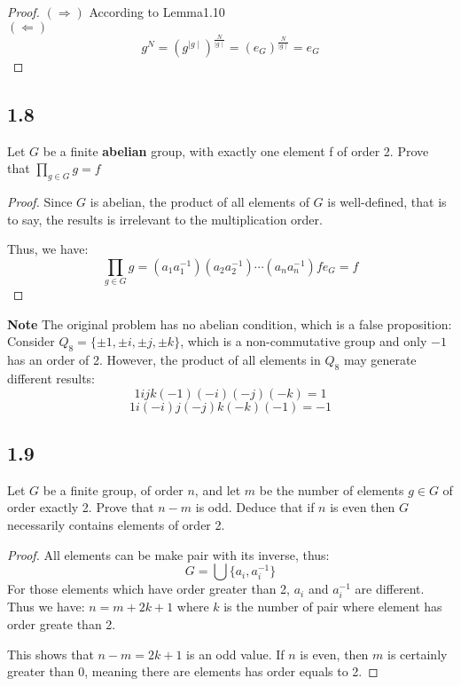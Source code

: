 \documentclass[a4paper, 12pt]{article}
\begin{document}
\begin{proof}
  $(\Rightarrow)$ According to Lemma1.10\\
  \indent\indent $(\Leftarrow)$ $$g^N=(g^{\mid g\mid})^{\frac{N}{\mid g\mid}}=(e_G)^{\frac{N}{\mid g\mid}}=e_G$$
\end{proof}

\subsection*{1.8} Let $G$ be a finite {\color{red}\textbf{abelian}} group, with exactly one element f of order 2. Prove that $\prod_{g\in G}g=f$
\begin{proof}
  Since $G$ is abelian, the product of all elements of $G$ is well-defined, that is to say, the results is irrelevant to the multiplication order.

  Thus, we have:
  $$
  \prod_{g\in G}g = (a_1a_1^{-1})(a_2a_2^{-1})\cdots(a_na_n^{-1})fe_G=f
  $$
\end{proof}
\noindent \textbf{Note} The original problem has no abelian condition, which is a false proposition: Consider 
$Q_8=\{\pm 1, \pm i, \pm j, \pm k\}$, which is a non-commutative group and only $-1$ has an order of 2. However, the 
product of all elements in $Q_8$ may generate different results:
$$
1ijk(-1)(-i)(-j)(-k) = 1
$$
$$
1i(-i)j(-j)k(-k)(-1) = -1
$$

\subsection*{1.9} Let $G$ be a finite group, of order $n$, and let $m$ be the number of 
elements $g \in G$ of order exactly 2. Prove that $n-m$ is odd. Deduce that if $n$ is even then
$G$ necessarily contains elements of order 2.
\begin{proof}
  All elements can be make pair with its inverse, thus:
  $$
  G=\bigcup \{a_i, a_i^{-1}\}
  $$
  For those elements which have order greater than 2, $a_i$ and $a_i^{-1}$ are different. Thus we have:
  $n = m + 2k + 1$ where $k$ is the number of pair where element has order greate than 2.

  This shows that $n-m=2k+1$ is an odd value. If $n$ is even, then $m$ is certainly greater than 0, meaning there 
  are elements has order equals to 2.
\end{proof}
\end{document}
